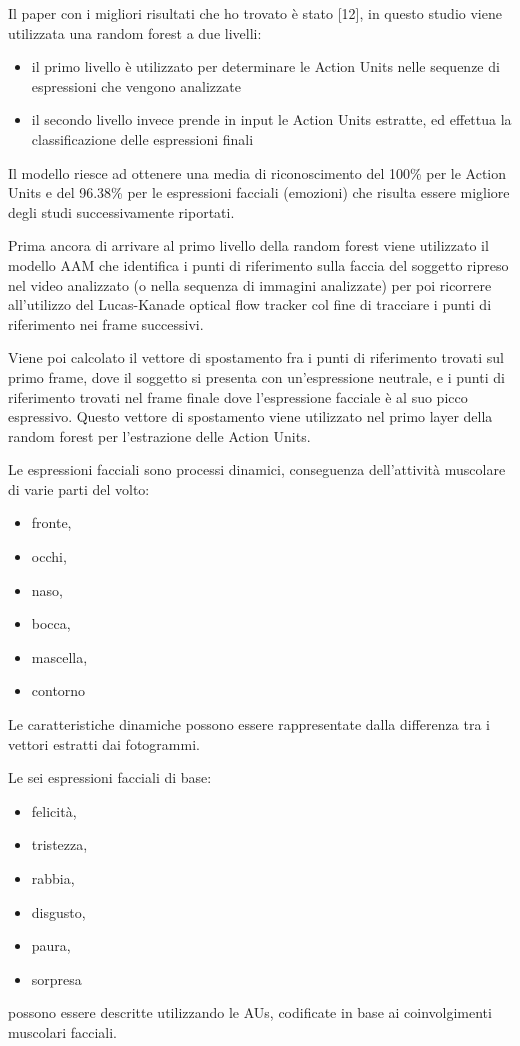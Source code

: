 Il paper con i migliori risultati che ho trovato è stato [12], in questo studio viene utilizzata una random forest a due livelli:
\begin{itemize}
    \item il primo livello è utilizzato per determinare le Action Units nelle sequenze di espressioni che vengono analizzate
    \item il secondo livello invece prende in input le Action Units estratte, ed effettua la classificazione delle espressioni finali
\end{itemize}

Il modello riesce ad ottenere una media di riconoscimento del 100\% per le Action Units e del 96.38\% per le espressioni facciali (emozioni) che risulta essere migliore degli studi successivamente riportati.

Prima ancora di arrivare al primo livello della random forest viene utilizzato il modello AAM che identifica i punti di riferimento sulla faccia del soggetto ripreso nel video analizzato (o nella sequenza di immagini analizzate) per poi ricorrere all’utilizzo del Lucas-Kanade optical flow tracker col fine di tracciare i punti di riferimento nei frame successivi.

Viene poi calcolato il vettore di spostamento fra i punti di riferimento trovati sul primo frame, dove il soggetto si presenta con un’espressione neutrale, e i punti di riferimento trovati nel frame finale dove l’espressione facciale è al suo picco espressivo. 
Questo vettore di spostamento viene utilizzato nel primo layer della random forest per l’estrazione delle Action Units.

Le espressioni facciali sono processi dinamici, conseguenza dell'attività muscolare di varie parti del volto:
\begin{itemize}
    \item fronte,
    \item occhi,
    \item naso,
    \item bocca,
    \item mascella,
    \item contorno
\end{itemize}

Le caratteristiche dinamiche possono essere rappresentate dalla differenza tra i vettori estratti dai fotogrammi. 

Le sei espressioni facciali di base:
\begin{itemize}
    \item felicità,
    \item tristezza,
    \item rabbia,
    \item disgusto,
    \item paura,
    \item sorpresa
\end{itemize}
possono essere descritte utilizzando le AUs, codificate in base ai coinvolgimenti muscolari facciali.

